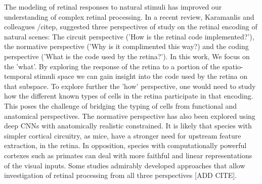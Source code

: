 The modeling of retinal responses to natural stimuli has improved our
understanding of complex retinal processing. In a recent review, Karamanlis and
colleagues /citep{}, suggested three perspectives of study on the retinal
encoding of natural scenes: The circuit perspective ('How is the retinal code
implemented?'), the normative perspective ('Why is it complimented this way?)
and the coding perspective ('What is the code used by the retina?'). In this
work,
We focus on the 'what'. By exploring the response of the retina to a portion of
the spatio-temporal stimuli space we can gain insight into the code used by the
retina on that subspace. To explore further the 'how' perspective, one would
need to study how the different known types of cells in the retina participate
in that encoding. This poses the challenge of bridging the typing of cells from
functional and anatomical perspectives.
The normative perspective has also been explored using deep CNNs with
anatomically realistic constrained. It is likely that species with simpler
cortical circuitry, as mice, have a stronger need for upstream feature
extraction, in the retina. In opposition, species with computationally powerful
cortexes such as primates can deal with more faithful and linear
representations
of the visual inputs.
Some studies admirably developed approaches that allow investigation of retinal
processing from all three perspectives [ADD CITE].
